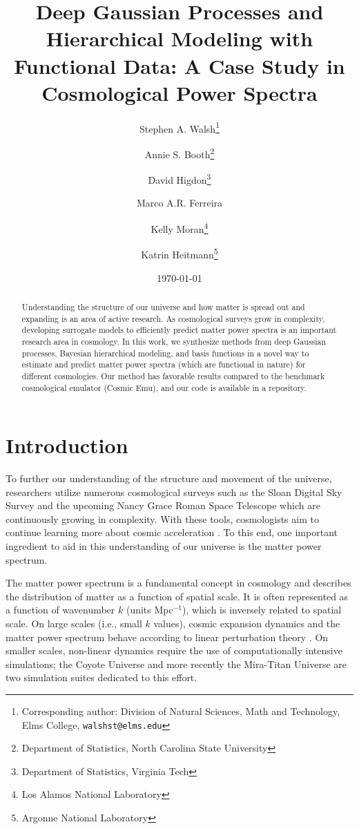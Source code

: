 \documentclass[11pt]{article}
\title{Deep Gaussian Processes and Hierarchical Modeling with Functional Data: A Case Study in Cosmological Power Spectra}
\author{Stephen A. Walsh\thanks{Corresponding author: Division of Natural Sciences, 
        Math and Technology, Elms College, {\tt walshst@elms.edu}} \and 
        Annie S. Booth\thanks{Department of Statistics, North Carolina State University} \and
        David Higdon\thanks{Department of Statistics, Virginia Tech} \and
        Marco A.R. Ferreira\footnotemark[3] \and
        Kelly Moran\thanks{Los Alamos National Laboratory} \and
        Katrin Heitmann\thanks{Argonne National Laboratory}}
\date{\today}
\begin{document}
\maketitle
\bigskip

\begin{abstract} 
Understanding the structure of our universe and how matter is spread out and expanding is an area of active research. As cosmological surveys grow in complexity, developing surrogate models to efficiently predict matter power spectra is an important research area in cosmology. In this work, we synthesize methods from deep Gaussian processes, Bayesian hierarchical modeling, and basis functions in a novel way to estimate and predict matter power spectra (which are functional in nature) for different cosmologies. Our method has favorable results compared to the benchmark cosmological emulator (Cosmic Emu), and our code is available in a repository.
\end{abstract}


\section{Introduction}

To further our understanding of the structure and movement of the universe, researchers utilize numerous cosmological surveys such as the Sloan Digital Sky Survey \citep{york2000sloan} and the upcoming Nancy Grace Roman Space Telescope \citep{Dore2019WFIRST} which are continuously growing in complexity. With these tools, cosmologists aim to continue learning more about cosmic acceleration \citep{caldwell2009physics}. To this end, one important ingredient to aid in this understanding of our universe is the matter power spectrum. 

The matter power spectrum is a fundamental concept in cosmology and describes the distribution of matter as a function of spatial scale. It is often represented as a function of wavenumber $k$ (units Mpc$^{-1}$), which is inversely related to spatial scale. On large scales (i.e., small $k$ values), cosmic expansion dynamics and the matter power spectrum behave according to linear perturbation theory \citep{pietroni2008flowing, lesgourgues2009non}. On smaller scales, non-linear dynamics require the use of computationally intensive simulations; the Coyote Universe \citep{lawrence2010coyote} and more recently the Mira-Titan Universe \citep{moran2023mira} are two simulation suites dedicated to this effort. 
\end{document}
